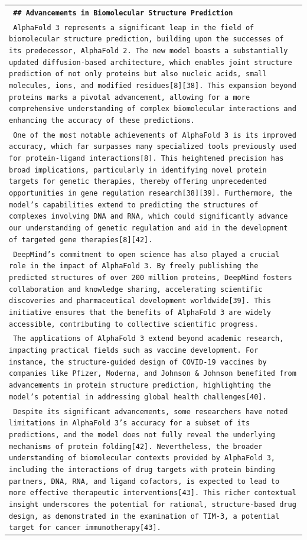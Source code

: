 \begin{longtable}{p{\textwidth}}
\texttt{\small{\textbf{ \#\# Advancements in Biomolecular Structure Prediction }}} \\
\texttt{\small{ AlphaFold 3 represents a significant leap in the field of biomolecular structure prediction, building upon the successes of its predecessor, AlphaFold 2. The new model boasts a substantially updated diffusion-based architecture, which enables joint structure prediction of not only proteins but also nucleic acids, small molecules, ions, and modified residues[8][38]. This expansion beyond proteins marks a pivotal advancement, allowing for a more comprehensive understanding of complex biomolecular interactions and enhancing the accuracy of these predictions. }} \\
\texttt{\small{ One of the most notable achievements of AlphaFold 3 is its improved accuracy, which far surpasses many specialized tools previously used for protein-ligand interactions[8]. This heightened precision has broad implications, particularly in identifying novel protein targets for genetic therapies, thereby offering unprecedented opportunities in gene regulation research[38][39]. Furthermore, the model's capabilities extend to predicting the structures of complexes involving DNA and RNA, which could significantly advance our understanding of genetic regulation and aid in the development of targeted gene therapies[8][42]. }} \\
\texttt{\small{ DeepMind's commitment to open science has also played a crucial role in the impact of AlphaFold 3. By freely publishing the predicted structures of over 200 million proteins, DeepMind fosters collaboration and knowledge sharing, accelerating scientific discoveries and pharmaceutical development worldwide[39]. This initiative ensures that the benefits of AlphaFold 3 are widely accessible, contributing to collective scientific progress. }} \\
\texttt{\small{ The applications of AlphaFold 3 extend beyond academic research, impacting practical fields such as vaccine development. For instance, the structure-guided design of COVID-19 vaccines by companies like Pfizer, Moderna, and Johnson \& Johnson benefited from advancements in protein structure prediction, highlighting the model's potential in addressing global health challenges[40]. }} \\
\texttt{\small{ Despite its significant advancements, some researchers have noted limitations in AlphaFold 3's accuracy for a subset of its predictions, and the model does not fully reveal the underlying mechanisms of protein folding[42]. Nevertheless, the broader understanding of biomolecular contexts provided by AlphaFold 3, including the interactions of drug targets with protein binding partners, DNA, RNA, and ligand cofactors, is expected to lead to more effective therapeutic interventions[43]. This richer contextual insight underscores the potential for rational, structure-based drug design, as demonstrated in the examination of TIM-3, a potential target for cancer immunotherapy[43]. }} \\

\end{longtable}
